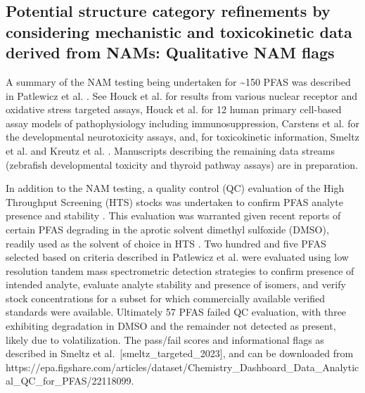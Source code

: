 \documentclass[
  super,
  preprint,
  3p]{elsarticle}
\begin{document}
\hypertarget{sec-nam-flag}{%
\subsection{Potential structure category refinements by considering
mechanistic and toxicokinetic data derived from NAMs: Qualitative NAM
flags}\label{sec-nam-flag}}

A summary of the NAM testing being undertaken for \textasciitilde150
PFAS was described in Patlewicz et al. \citep{patlewicz_towards_2022}.
See Houck et al. \citep{houck_bioactivity_2021} for results from various
nuclear receptor and oxidative stress targeted assays, Houck et al.
\citep{houck_evaluation_2023} for 12 human primary cell-based assay
models of pathophysiology including immunosuppression, Carstens et al.
\citep{carstens_evaluation_2023} for the developmental neurotoxicity
assays, and, for toxicokinetic information, Smeltz et al.
\citep{smeltz_plasma_2023} and Kreutz et al.
\citep{kreutz_category-based_2023}. Manuscripts describing the remaining
data streams (zebrafish developmental toxicity and thyroid pathway
assays) are in preparation.

In addition to the NAM testing, a quality control (QC) evaluation of the
High Throughput Screening (HTS) stocks was undertaken to confirm PFAS
analyte presence and stability \citep{smeltz_targeted_2023}. This
evaluation was warranted given recent reports of certain PFAS degrading
in the aprotic solvent dimethyl sulfoxide (DMSO), readily used as the
solvent of choice in HTS
\citep{liberatore_solvent_2020, zhang_stability_2022}. Two hundred and
five PFAS selected based on criteria described in Patlewicz et al.
\citep{patlewicz_towards_2022} were evaluated using low resolution
tandem mass spectrometric detection strategies to confirm presence of
intended analyte, evaluate analyte stability and presence of isomers,
and verify stock concentrations for a subset for which commercially
available verified standards were available. Ultimately 57 PFAS failed
QC evaluation, with three exhibiting degradation in DMSO and the
remainder not detected as present, likely due to volatilization. The
pass/fail scores and informational flags as described in Smeltz et
al.~{[}smeltz\_targeted\_2023{]}, and can be downloaded from
https://epa.figshare.com/articles/dataset/Chemistry\_Dashboard\_Data\_Analytical\_QC\_for\_PFAS/22118099.
\end{document}
